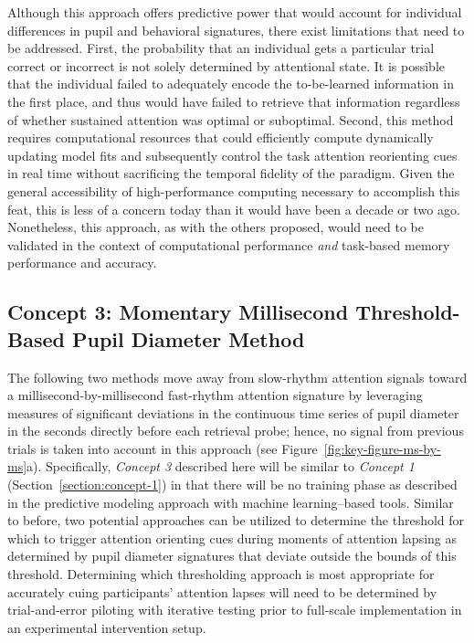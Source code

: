 Although this approach offers predictive power that would account for individual differences in pupil and behavioral signatures, there exist limitations that need to be addressed. First, the probability that an individual gets a particular trial correct or incorrect is not solely determined by attentional state. It is possible that the individual failed to adequately encode the to-be-learned information in the first place, and thus would have failed to retrieve that information regardless of whether sustained attention was optimal or suboptimal. Second, this method requires computational resources that could efficiently compute dynamically updating model fits and subsequently control the task attention reorienting cues in real time without sacrificing the temporal fidelity of the paradigm. Given the general accessibility of high-performance computing necessary to accomplish this feat, this is less of a concern today than it would have been a decade or two ago. Nonetheless, this approach, as with the others proposed, would need to be validated in the context of computational performance \emph{and} task-based memory performance and accuracy.

\subsection{Concept 3: Momentary Millisecond Threshold-Based Pupil Diameter Method}\label{section:concept-3}

The following two methods move away from slow-rhythm attention signals toward a millisecond-by-millisecond fast-rhythm attention signature by leveraging measures of significant deviations in the continuous time series of pupil diameter in the seconds directly before each retrieval probe; hence, no signal from previous trials is taken into account in this approach (see Figure~\ref{fig:key-figure-ms-by-ms}a). Specifically, \emph{Concept 3} described here will be similar to \emph{Concept 1} (Section~\ref{section:concept-1}) in that there will be no training phase as described in the predictive modeling approach with machine learning--based tools. Similar to before, two potential approaches can be utilized to determine the threshold for which to trigger attention orienting cues during moments of attention lapsing as determined by pupil diameter signatures that deviate outside the bounds of this threshold. Determining which thresholding approach is most appropriate for accurately cuing participants' attention lapses will need to be determined by trial-and-error piloting with iterative testing prior to full-scale implementation in an experimental intervention setup.

